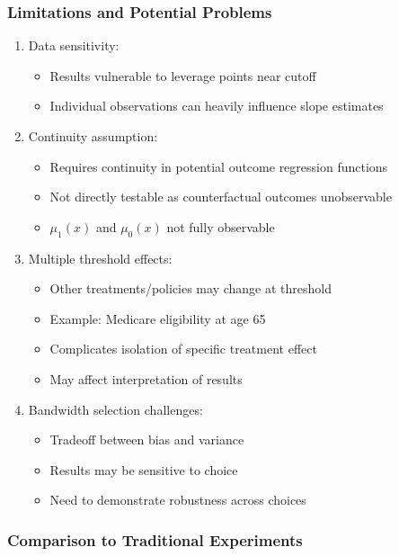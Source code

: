 \subsubsection{Limitations and Potential Problems}

\begin{enumerate}
    \item Data sensitivity:
    \begin{itemize}
        \item Results vulnerable to leverage points near cutoff
        \item Individual observations can heavily influence slope estimates
    \end{itemize}

    \item Continuity assumption:
    \begin{itemize}
        \item Requires continuity in potential outcome regression functions
        \item Not directly testable as counterfactual outcomes unobservable
        \item $\mu_1(x)$ and $\mu_0(x)$ not fully observable
    \end{itemize}

    \item Multiple threshold effects:
    \begin{itemize}
        \item Other treatments/policies may change at threshold
        \item Example: Medicare eligibility at age 65
        \item Complicates isolation of specific treatment effect
        \item May affect interpretation of results
    \end{itemize}

    \item Bandwidth selection challenges:
    \begin{itemize}
        \item Tradeoff between bias and variance
        \item Results may be sensitive to choice
        \item Need to demonstrate robustness across choices
    \end{itemize}
\end{enumerate}

\subsubsection{Comparison to Traditional Experiments}

